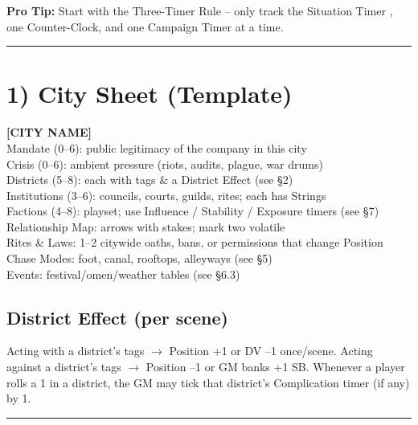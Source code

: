 \documentclass[11pt]{article}
\newcommand{\sectionrule}{\vspace{0.5em}\noindent\textcolor{gray}{\rule{\textwidth}{0.4pt}}\par\vspace{0.5em}}
\begin{document}
\textbf{Pro Tip:} Start with the Three-Timer Rule -- only track the Situation Timer , one Counter-Clock, and one Campaign Timer at a time.

\sectionrule

\section*{1) City Sheet (Template)}
\textbf{[CITY NAME]} \\
Mandate (0--6): public legitimacy of the company in this city \\
Crisis (0--6): ambient pressure (riots, audits, plague, war drums) \\
Districts (5--8): each with tags \& a District Effect (see \S2) \\
Institutions (3--6): councils, courts, guilds, rites; each has Strings \\
Factions (4--8): playset; use Influence / Stability / Exposure timers (see \S7) \\
Relationship Map: arrows with stakes; mark two volatile \\
Rites \& Laws: 1--2 citywide oaths, bans, or permissions that change Position \\
Chase Modes: foot, canal, rooftops, alleyways (see \S5) \\
Events: festival/omen/weather tables (see \S6.3) \\

\subsection*{District Effect (per scene)}
Acting with a district's tags $\rightarrow$ Position +1 or DV --1 once/scene.  
Acting against a district's tags $\rightarrow$ Position --1 or GM banks +1 SB.  
Whenever a player rolls a 1 in a district, the GM may tick that district's Complication timer (if any) by 1.

\sectionrule
\end{document}
